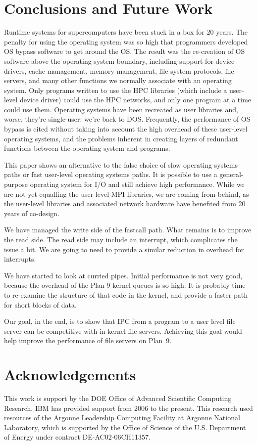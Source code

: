 \documentclass[letterpaper,twocolumn,10pt]{article}
\begin{document}
\section{Conclusions and Future Work}
Runtime systems for supercomputers have been stuck in a box for 20 years. The penalty for using the operating system was so high that programmers developed OS bypass software to get around the OS. The result was the re-creation of OS software above the operating system boundary, including support for device drivers, cache management, memory management, file system protocols, file servers, and many other functions we normally associate with an operating system. Only programs written to use the HPC libraries (which include a user-level device driver) could use the HPC networks, and only one program at a time could use them. Operating systems have been recreated as user libraries and, worse, they're single-user: we're back to DOS. Frequently, the performance of OS bypass is cited without taking into account the high overhead of these user-level operating systems, and the problems inherent in creating layers of redundant functions between the operating system and programs. 

This paper shows an alternative to the false choice of slow operating systems paths or fast user-level operating systems paths. It is possible to use a general-purpose operating system for I/O and still achieve high performance. While we are not yet equalling the user-level MPI libraries, we are coming from behind, as the user-level libraries and associated network hardware have benefited from 20 years of co-design. 

We have managed the write side of the fastcall path. What remains is to improve the read side. The read side may include an interrupt, which complicates the issue a bit. We are going to need to provide a similar reduction in overhead for interrupts. 

We have started to look at curried pipes. Initial performance is not very good, because the overhead of 
the Plan 9 kernel queues is so high. It is probably time to re-examine the structure of that code in the kernel, and provide 
a faster path for short blocks of data. 

Our goal, in the end, is to show that IPC from a program to a user level file server can be competitive 
with in-kernel file servers. Achieving this goal would help improve the performance of file servers on Plan~9. 
\section{Acknowledgements}
This work is support by the DOE Office of Advanced Scientific Computing Research. IBM has provided support from 2006 to the present. This research used resources of the Argonne Leadership Computing Facility
 at Argonne National Laboratory, which is supported by the Office of Science
 of the U.S.
 Department of Energy under contract DE-AC02-06CH11357.

 

\end{document}
